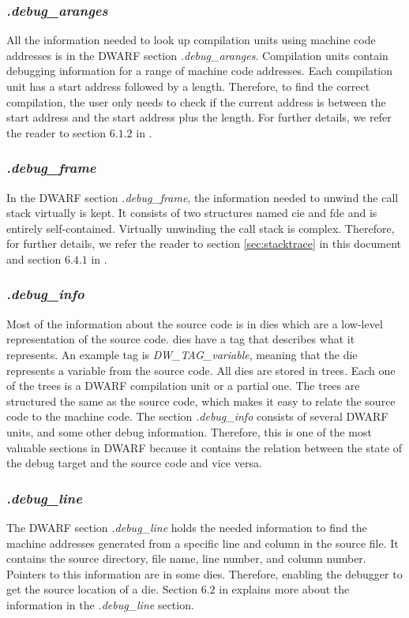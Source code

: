 \subsubsection{\emph{.debug\_aranges}}
All the information needed to look up compilation units using machine code addresses is in the \gls{DWARF} section \emph{.debug\_aranges}.
Compilation units contain debugging information for a range of machine code addresses.
Each compilation unit has a start address followed by a length.
Therefore, to find the correct compilation, the user only needs to check if the current address is between the start address and the start address plus the length.
For further details, we refer the reader to section $6.1.2$ in \cite{dwarf}.


\subsubsection{\emph{.debug\_frame}}
In the \gls{DWARF} section \emph{.debug\_frame}, the information needed to unwind the call stack virtually is kept.
It consists of two structures named \acrfull{cie} and \acrfull{fde} and is entirely self-contained.
Virtually unwinding the call stack is complex.
Therefore, for further details, we refer the reader to section \ref{sec:stacktrace} in this document and section $6.4.1$ in \cite{dwarf}.


\subsubsection{\emph{.debug\_info}}
Most of the information about the source code is in \glspl{die} which are a low-level representation of the source code.
\glspl{die} have a tag that describes what it represents.
An example tag is \emph{DW\_TAG\_variable}, meaning that the \gls{die} represents a variable from the source code.
All \glspl{die} are stored in trees.
Each one of the trees is a \gls{DWARF} compilation unit or a partial one.
The trees are structured the same as the source code, which makes it easy to relate the source code to the machine code.
The section \emph{.debug\_info} consists of several \gls{DWARF} units, and some other debug information.
Therefore, this is one of the most valuable sections in \gls{DWARF} because it contains the relation between the state of the debug target and the source code and vice versa.


\subsubsection{\emph{.debug\_line}}
The \gls{DWARF} section \emph{.debug\_line} holds the needed information to find the machine addresses generated from a specific line and column in the source file.
It contains the source directory, file name, line number, and column number.
Pointers to this information are in some \glspl{die}.
Therefore, enabling the debugger to get the source location of a \gls{die}.
Section $6.2$ in \cite{dwarf} explains more about the information in the \emph{.debug\_line} section.


